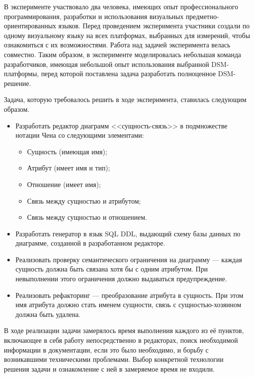 В эксперименте участвовало два человека, имеющих опыт профессионального программирования,
разработки и использования визуальных предметно-ориентированных языков. Перед проведением
эксперимента участники создали по одному визуальному языку на всех платформах, выбранных
для измерений, чтобы ознакомиться с их возможностями. Работа над задачей эксперимента
велась совместно. Таким образом, в эксперименте моделировалась небольшая команда разработчиков, 
имеющая небольшой опыт использования выбранной \ac{DSM}-платформы, перед которой поставлена 
задача разработать полноценное \ac{DSM}-решение.

Задача, которую требовалось решить в ходе эксперимента, ставилась следующим образом.
\begin{itemize}
	\item Разработать редактор диаграмм <<сущность-связь>> в подмножестве нотации Чена со
		следующими элементами:
		\begin{itemize}
			\item Сущность (имеющая имя);
			\item Атрибут (имеет имя и тип);
			\item Отношение (имеет имя);
			\item Связь между сущностью и атрибутом;
			\item Связь между сущностью и отношением.
		\end{itemize}
	\item Разработать генератор в язык \ac{SQL} \ac{DDL}, выдающий схему базы данных по 
		диаграмме, созданной в разработанном редакторе.
	\item Реализовать проверку семантического ограничения на диаграмму --- каждая сущность
		должна быть связана хотя бы с одним атрибутом. При невыполнении этого ограничения должно 
		выдаваться предупреждение.
	\item Реализовать рефакторинг --- преобразование атрибута в сущность. При этом имя атрибута 
		должно стать именем сущности, связь с сущностью-хозяином должна быть удалена.
\end{itemize}

В ходе реализации задачи замерялось время выполнения каждого из её пунктов, включающее
в себя работу непосредственно в редакторах, поиск необходимой информации в документации, если это было необходимо, 
и борьбу с возникавшими техническими проблемами. Выбор конкретной технологии решения задачи 
и ознакомление с ней в замеряемое время не входили.

